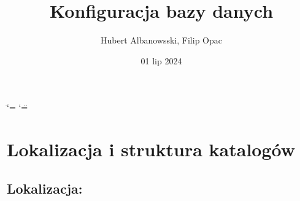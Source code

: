 \documentclass[letterpaper,10pt,polish]{sphinxmanual}
\title{Konfiguracja bazy danych}
\date{01 lip 2024}
\author{Hubert Albanowsski, Filip Opac}
\begin{document}
\ifdefined\shorthandoff
  \ifnum\catcode`\=\string=\active\shorthandoff{=}\fi
  \ifnum\catcode`\"=\active{}\fi
\fi

\pagestyle{empty}
\sphinxmaketitle
\pagestyle{plain}
\sphinxtableofcontents
\pagestyle{normal}
\label{\detokenize{index::doc}}


\sphinxstepscope


\chapter{Lokalizacja i struktura katalogów}
\label{\detokenize{rozdzialy/rozdzial1:lokalizacja-i-struktura-katalogow}}\label{\detokenize{rozdzialy/rozdzial1::doc}}

\section{Lokalizacja:}
\end{document}
